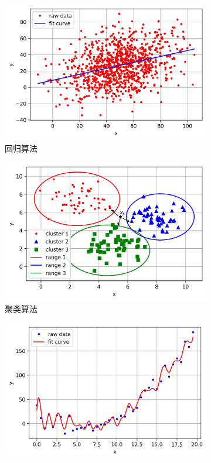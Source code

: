  \begin{figure}[htp]
	 \centering

	 \begin{subfigure}{.33\textwidth}
		 \centering
		 \includegraphics[width=\linewidth]{ch02/img/ch2/2.1/1.jpg}
		 \caption{回归算法}
		 \label{fig:2.sub.1}
	 \end{subfigure}\hfil%
	 \begin{subfigure}{.33\textwidth}
		 \centering
		 \includegraphics[width=\linewidth]{ch02/img/ch2/2.1/2.jpg}
		 \caption{聚类算法}
		 \label{fig:2.sub.2}
	 \end{subfigure}\hfil%
	 \begin{subfigure}{.33\textwidth}
		 \centering
		 \includegraphics[width=\linewidth]{ch02/img/ch2/2.1/3.jpg}

\end{subfigure}
\end{figure}
